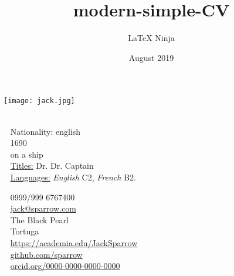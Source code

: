 \documentclass[english]{modernsimplecv}
\title{modern-simple-CV}
\author{\LaTeX{} Ninja}
\date{August 2019}
\begin{document}
\thispagestyle{empty}




\begin{minipage}[t]{0.21\textwidth}
\vspace{0pt} %
\texttt{[image: jack.jpg]}\hspace{1em}
\end{minipage}
\hfill
\begin{minipage}[t]{0.77\textwidth}
\vspace{0pt} %
\begin{shaded*}

\begin{minipage}[t]{0.4\textwidth}
\vspace{0pt} %
{\par\centering\huge{}} \\[0.3cm]
\faGlobe~ Nationality: english\\
\faBirthdayCake~ 1690 \\
\faMapMarker~ on a ship \\

{\small
\faGraduationCap~ \underline{Titles:} Dr. Dr. Captain \\
\faCommentsO~ \underline{Languages:} \emph{English} C2, \emph{French} B2.}
\end{minipage}\hfill
\begin{minipage}[t]{0.55\textwidth}
\vspace{0pt} %
\faPhone~ 0999/999 6767400 \\
\faAt~ \protect\url{jack@sparrow.com} \\

\faEnvelopeO~ The Black Pearl \\ 
\faMapMarker~ Tortuga \\

\faFont~ \protect\url{https://academia.edu/JackSparrow} \\
\faGithub~ \protect\url{github.com/sparrow} \\
\faCircle~ \protect\url{orcid.org/0000-0000-0000-0000} \\
\end{minipage}
\hfill
\end{shaded*}
\end{minipage}\\[15pt]
\end{document}
